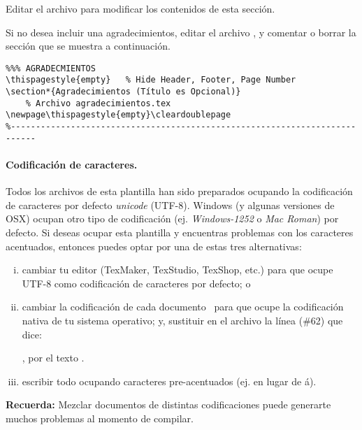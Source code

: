 Editar el archivo  para modificar los contenidos de esta sección.

Si no desea incluir una agradecimientos, editar el archivo , y comentar o borrar la sección que se muestra a continuación.

\begin{Verbatim}[frame=lines, label=\inlinecode{/latex/memoria.tex} (extracto)
, fontsize=\footnotesize
, baselinestretch=1
, formatcom=\color{gray}]
%---------------------------------------------------------------------------
%%% AGRADECMIENTOS
\thispagestyle{empty} 	% Hide Header, Footer, Page Number
\section*{Agradecimientos (Título es Opcional)}
	% Archivo agradecimientos.tex
\newpage\thispagestyle{empty}\cleardoublepage
%---------------------------------------------------------------------------
\end{Verbatim}

\paragraph{Codificación de caracteres.}

Todos los archivos  de esta plantilla han sido preparados ocupando la codificación de caracteres por defecto \emph{unicode} (UTF-8). Windows (y algunas versiones de OSX) ocupan otro tipo de codificación (ej. \emph{Windows-1252} o \emph{Mac Roman}) por defecto. Si deseas ocupar esta plantilla y encuentras problemas con los caracteres acentuados, entonces puedes optar por una de estas tres alternativas:
\begin{enumerate}[i)]
    \item cambiar tu editor (TexMaker, TexStudio, TexShop, etc.) para que ocupe UTF-8 como codificación de caracteres por defecto; o
    \item cambiar la codificación de cada documento  para que ocupe la codificación nativa de tu sistema operativo; y, sustituir en el archivo  la línea (\#62) que dice:
    
    , por el texto .
    \item escribir todo ocupando caracteres pre-acentuados (ej.  en lugar de á).
\end{enumerate}

\begin{framed}
    \textbf{Recuerda:} Mezclar documentos de distintas codificaciones puede generarte muchos problemas al momento de compilar.  
\end{framed}
